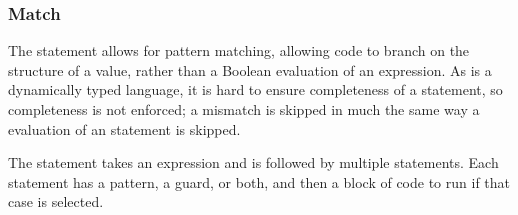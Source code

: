 \begin{prooftree}
\end{prooftree}
\begin{prooftree}
\end{prooftree}
\begin{prooftree}
\end{prooftree}
\begin{prooftree}
\end{prooftree}

\subsubsection{Match}

The  statement allows for pattern matching, allowing code to branch
on the structure of a value, rather than a Boolean evaluation of an expression.
As \Trilogy{} is a dynamically typed language, it is hard to ensure completeness
of a  statement, so completeness is not enforced; a mismatch is skipped
in much the same way a  evaluation of an  statement is skipped.

The  statement takes an expression and is followed by multiple 
statements. Each  statement has a pattern, a guard, or both, and then a block
of code to run if that case is selected.

\begin{bnf*}
     \\
     \\
     \\
     \\
\end{bnf*}

